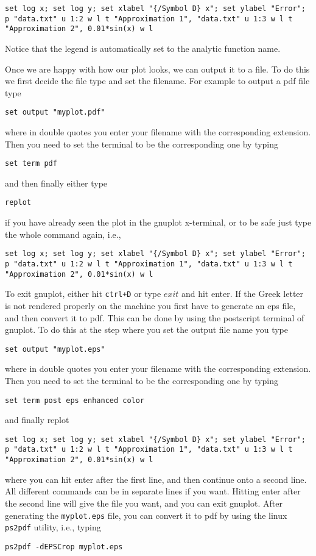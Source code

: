 \documentclass[aps,showpacs,prd,notitlepage,preprintnumbers,amsmath,amssymb,letterpaper]{revtex4}
\begin{document}
\begin{verbatim}
set log x; set log y; set xlabel "{/Symbol D} x"; set ylabel "Error";  
p "data.txt" u 1:2 w l t "Approximation 1", "data.txt" u 1:3 w l t "Approximation 2", 0.01*sin(x) w l
\end{verbatim}
%
Notice that the legend is automatically set to the analytic function name.

Once we are happy with how our plot looks, we can output it to a file. To do this we first
decide the file type and set the filename. For example to output a pdf file type

\begin{verbatim}
set output "myplot.pdf"
\end{verbatim}
%
where in double quotes you enter your filename with the corresponding extension.
Then you need to set the terminal to be the corresponding one by typing
%
\begin{verbatim}
set term pdf
\end{verbatim}
%
and then finally either type
\begin{verbatim}
replot
\end{verbatim}
%
if you have already seen the plot in the gnuplot x-terminal, or to be safe just type
the whole command again, i.e.,
\begin{verbatim}
set log x; set log y; set xlabel "{/Symbol D} x"; set ylabel "Error";  
p "data.txt" u 1:2 w l t "Approximation 1", "data.txt" u 1:3 w l t "Approximation 2", 0.01*sin(x) w l
\end{verbatim}
%

To exit gnuplot, either hit {\tt ctrl+D} or type $exit$ and hit enter. If the Greek letter is not rendered properly on the
machine you first have to generate an eps file, and then convert it to pdf. This can be done by using the postscript terminal
of gnuplot. To do this at the step where you set the output file name you type
%
\begin{verbatim}
set output "myplot.eps"
\end{verbatim}
%
where in double quotes you enter your filename with the corresponding extension.
Then you need to set the terminal to be the corresponding one by typing
%
\begin{verbatim}
set term post eps enhanced color
\end{verbatim}
%
and finally replot
%
\begin{verbatim}
set log x; set log y; set xlabel "{/Symbol D} x"; set ylabel "Error";  
p "data.txt" u 1:2 w l t "Approximation 1", "data.txt" u 1:3 w l t "Approximation 2", 0.01*sin(x) w l
\end{verbatim}
%
where you can hit enter after the first line, and then continue onto a
second line. All different commands can be in separate lines if you
want. Hitting enter after the second line will give the file you want,
and you can exit gnuplot. After generating the {\tt myplot.eps} file,
you can convert it to pdf by using the linux {\tt ps2pdf} utility,
i.e., typing
%
\begin{verbatim}
ps2pdf -dEPSCrop myplot.eps
\end{verbatim}
\end{document}
